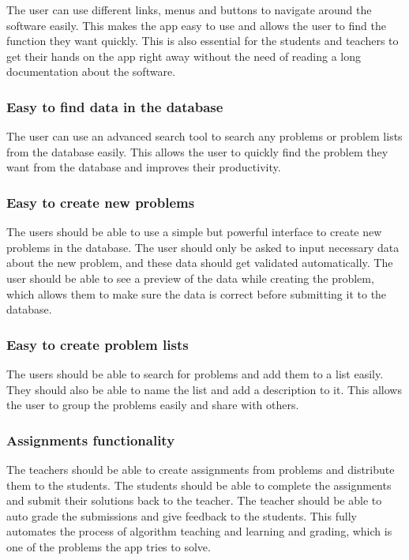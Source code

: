 \documentclass[a4paper]{report}
\begin{document}
The user can use different links, menus and buttons to navigate around the software easily. This makes the app easy to use and allows the user to find the function they want quickly. This is also essential for the students and teachers to get their hands on the app right away without the need of reading a long documentation about the software.

\subsubsection{Easy to find data in the database}

The user can use an advanced search tool to search any problems or problem lists from the database easily. This allows the user to quickly find the problem they want from the database and improves their productivity.

\subsubsection{Easy to create new problems}

The users should be able to use a simple but powerful interface to create new problems in the database. The user should only be asked to input necessary data about the new problem, and these data should get validated automatically. The user should be able to see a preview of the data while creating the problem, which allows them to make sure the data is correct before submitting it to the database.

\subsubsection{Easy to create problem lists}

The users should be able to search for problems and add them to a list easily. They should also be able to name the list and add a description to it. This allows the user to group the problems easily and share with others.

\subsubsection{Assignments functionality}

The teachers should be able to create assignments from problems and distribute them to the students. The students should be able to complete the assignments and submit their solutions back to the teacher. The teacher should be able to auto grade the submissions and give feedback to the students. This fully automates the process of algorithm teaching and learning and grading, which is one of the problems the app tries to solve.
\end{document}
